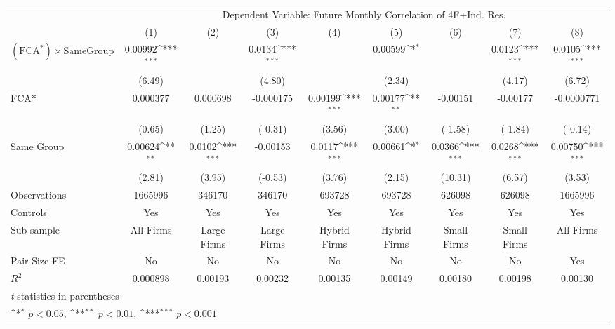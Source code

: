 {
\def\sym#1{\ifmmode^{#1}\else\(^{#1}\)\fi}
\begin{tabular}{l*{8}{c}}
\hline\hline
                &\multicolumn{8}{c}{Dependent Variable: Future Monthly Correlation of 4F+Ind. Res.}                                                                     \\\cmidrule(lr){2-9}
                &\multicolumn{1}{c}{(1)}         &\multicolumn{1}{c}{(2)}         &\multicolumn{1}{c}{(3)}         &\multicolumn{1}{c}{(4)}         &\multicolumn{1}{c}{(5)}         &\multicolumn{1}{c}{(6)}         &\multicolumn{1}{c}{(7)}         &\multicolumn{1}{c}{(8)}         \\
\hline
 $ (\text{FCA}^*) \times {\text{SameGroup} }  $ &  0.00992\sym{***}&                  &   0.0134\sym{***}&                  &  0.00599\sym{*}  &                  &   0.0123\sym{***}&   0.0105\sym{***}\\
                &   (6.49)         &                  &   (4.80)         &                  &   (2.34)         &                  &   (4.17)         &   (6.72)         \\
[1em]
$ \text{FCA*} $ & 0.000377         & 0.000698         &-0.000175         &  0.00199\sym{***}&  0.00177\sym{**} & -0.00151         & -0.00177         &-0.0000771         \\
                &   (0.65)         &   (1.25)         &  (-0.31)         &   (3.56)         &   (3.00)         &  (-1.58)         &  (-1.84)         &  (-0.14)         \\
[1em]
Same Group      &  0.00624\sym{**} &   0.0102\sym{***}& -0.00153         &   0.0117\sym{***}&  0.00661\sym{*}  &   0.0366\sym{***}&   0.0268\sym{***}&  0.00750\sym{***}\\
                &   (2.81)         &   (3.95)         &  (-0.53)         &   (3.76)         &   (2.15)         &  (10.31)         &   (6.57)         &   (3.53)         \\
\hline
Observations    &  1665996         &   346170         &   346170         &   693728         &   693728         &   626098         &   626098         &  1665996         \\
Controls        &      Yes         &      Yes         &      Yes         &      Yes         &      Yes         &      Yes         &      Yes         &      Yes         \\
Sub-sample      &All Firms         &Large Firms         &Large Firms         &Hybrid Firms         &Hybrid Firms         &Small Firms         &Small Firms         &All Firms         \\
Pair Size FE    &       No         &       No         &       No         &       No         &       No         &       No         &       No         &      Yes         \\
$ R^2 $         & 0.000898         &  0.00193         &  0.00232         &  0.00135         &  0.00149         &  0.00180         &  0.00198         &  0.00130         \\
\hline\hline
\multicolumn{9}{l}{\footnotesize \textit{t} statistics in parentheses}\\
\multicolumn{9}{l}{\footnotesize \sym{*} \(p<0.05\), \sym{**} \(p<0.01\), \sym{***} \(p<0.001\)}\\
\end{tabular}
}
